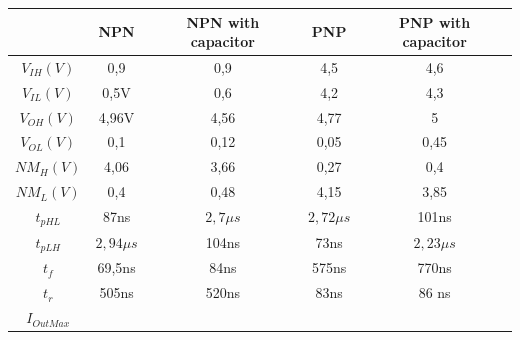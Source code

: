 \begin{tabular}{|c|c|c|c|c|}
\hline
 & NPN & NPN with capacitor &PNP& PNP with capacitor\\
\hline
\hline
$V_{IH} (V)$ & 0,9 & 0,9 & 4,5 & 4,6  \\
\hline
$V_{IL} (V)$ & 0,5V & 0,6 & 4,2 & 4,3 \\
\hline
$V_{OH} (V)$ & 4,96V & 4,56 & 4,77 & 5 \\
\hline
$V_{OL} (V)$ & 0,1 & 0,12 & 0,05 & 0,45\\ 
\hline
$NM_{H} (V) $ & 4,06 & 3,66 & 0,27 & 0,4\\ %
\hline
$NM_{L} (V) $ & 0,4 & 0,48 & 4,15 & 3,85 \\  %
\hline
$t_{pHL}$ & 87ns & $2,7\mu s $ &  $2,72\mu s$ & 101ns \\
\hline
$t_{pLH}$ & $2,94\mu s$ &  104ns &  73ns &  $2,23\mu s$\\
\hline
$t_{f}$ & 69,5ns & 84ns & 575ns & 770ns\\
\hline
$t_{r}$ & 505ns & 520ns & 83ns & 86 ns\\
\hline
$ I_{Out{Max}}$ &   &   &   &   \\ %
\hline
\end{tabular}





 
























